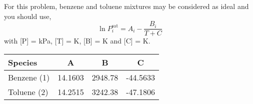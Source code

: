 \documentclass[calculator,allquestions,datasheet,solutions]{exam_newMarcus2}
\newcommand{\frc}{\displaystyle\frac}
\begin{document}
\begin{question}
\begin{enumerate}[(a)]
{ }

%
\end{enumerate}

For this problem, benzene and toluene mixtures may be considered as ideal and you should use,
\begin{displaymath}
   \ln P_{i}^{\text{sat}} = A_{i} - \frc{B_{i}}{T + C}
\end{displaymath} 
with [P] = kPa, [T] = K, [B] = K and [C] = K.
    \begin{center}
       \begin{tabular}{l | c c c}   
           {\bf Species}  &   {\bf A } &  {\bf B } &  {\bf C } \\
           \hline
             Benzene (1)  &  14.1603   &  2948.78  & -44.5633  \\
             Toluene (2)  &  14.2515   &  3242.38  & -47.1806   
       \end{tabular}
    \end{center}
%
\end{question}

\clearpage
\end{document}
